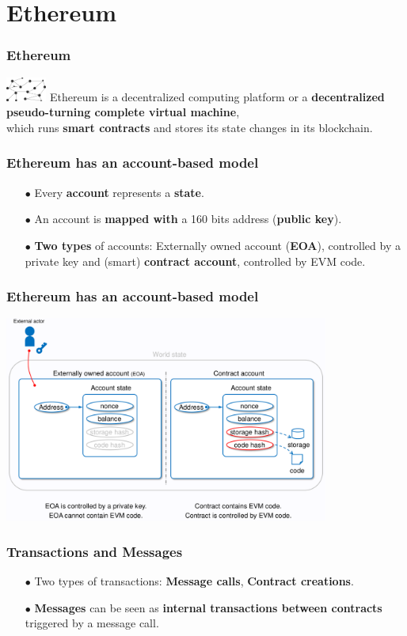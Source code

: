 \documentclass{beamer}
\begin{document}
\section{Ethereum}
\begin{frame}
\frametitle{Ethereum}
\includegraphics[width=0.1\textwidth,right]{bc}
Ethereum is a decentralized computing platform or a \textbf{decentralized pseudo-turning complete virtual machine}, \\which runs \textbf{smart contracts} and stores its state changes in its blockchain.
\end{frame}

\begin{frame}
\frametitle{Ethereum has an account-based model}
	\begin{itemize}
	\item[$\bullet$] Every \textbf{account} represents a \textbf{state}.
	\item[$\bullet$] An account is \textbf{mapped with} a 160 bits address (\textbf{public key}).
	\item[$\bullet$] \textbf{Two types} of accounts: Externally owned account (\textbf{EOA}), controlled by a private key and (smart) \textbf{contract account}, controlled by EVM code.
\end{itemize}
\end{frame}

\begin{frame}
	\frametitle{Ethereum has an account-based model}
	\includegraphics[width=0.8\textwidth, center]{../images/accounts}

\end{frame}

\begin{frame}
	\frametitle{Transactions and Messages}
	\begin{itemize}
	\item[$\bullet$] Two types of transactions: \textbf{Message calls}, \textbf{Contract creations}. \linebreak
	\item[$\bullet$] \textbf{Messages} can be seen as \textbf{internal transactions between contracts} triggered by a message call.
	\end{itemize}
\end{frame}
\end{document}
